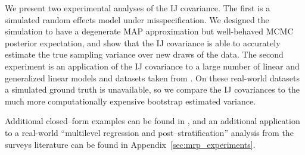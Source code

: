We present two experimental analyses of the IJ covariance.  The first is a
simulated random effects model under misspecification.  We designed the
simulation to have a degenerate MAP approximation but well-behaved MCMC
posterior expectation, and show that the IJ covariance is able to accurately
estimate the true sampling variance over new draws of the data. The second
experiment is an application of the IJ covariance to a large number of linear
and generalized linear models and datasets taken from \citet{gelman:2006:arm}.
On these real-world datasets a simulated ground truth is unavailable, so we
compare the IJ covariances to the much more computationally expensive bootstrap
estimated variance.

Additional closed--form examples can be found in
, and an additional application to a
real-world ``multilevel regression and post--stratification'' analysis from the
surveys literature \citep{park:2004:mrp} can be found in
Appendix~\ref{sec:mrp_experiments}.
